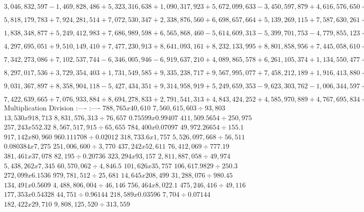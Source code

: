 \(3,046,832,597-1,469,828,486+5,323,316,638+1,090,317,923+5,672,099,633-3,450,597,879+4,616,576,650+2,490,531,866-6,087,202,362-2,060,006,143\)

\(5,818,179,783+7,924,281,514+7,072,530,347+2,338,876,560+6,698,657,664+5,139,269,115+7,587,630,261+8,889,254,029+1,070,797,560+2,544,433,806\)

\(1,838,348,877+5,249,412,983+7,686,989,598+6,565,868,460-5,614,609,313-5,399,701,753-4,779,855,123+4,718,397,326-7,372,173,189+5,226,089,928\)

\(4,297,695,051+9,510,149,410+7,477,230,913+8,641,093,161+8,232,133,995+8,801,858,956+7,445,058,610+5,932,935,282+5,090,830,532+5,159,256,924\)

\(7,342,273,086+7,102,537,744-6,346,005,946-6,919,637,210+4,089,865,578+6,261,105,374+1,134,550,477+1,790,088,083-9,911,246,085-1,025,755,541\)

\(8,297,017,536+3,729,354,403+1,731,549,585+9,335,238,717+9,567,995,077+7,458,212,189+1,916,413,880+8,261,869,572+9,872,992,690+1,007,645,965\)

\(9,031,367,897+8,358,904,118-5,427,434,351+9,314,958,919+5,249,659,353-9,623,303,762-1,006,344,597+3,211,691,813+2,908,950,955-7,443,428,246\)

\(7,422,639,665+7,076,933,884+8,694,278,833+2,791,541,313+4,843,424,252+4,585,970,889+4,767,695,834+7,745,519,868+6,614,663,568+5,753,224,187\)
\textbar{} Multiplication \textbar{} Division \textbar{} \textbar:----
\textbar:---- \textbar{} \textbar{} \(788,765 x 40,610\) \textbar{}
\(7,560,615,603÷93,803\) \textbar{} \textbar{} \(13,530 x 918,713\)
\textbar{} \(8,831,576,313÷76,657\) \textbar{} \textbar{}
\(0.75599 x 0.99407\) \textbar{} \(411,509.5654÷250,975\) \textbar{}
\textbar{} \(257,243 x 552.32\) \textbar{} \(8,567,517,915÷65,655\)
\textbar{} \textbar{} \(784,400 x 0.07097\) \textbar{}
\(49,972.26654÷155.1\) \textbar{} \textbar{} \(917,142 x 80,960\)
\textbar{} \(960.111708÷0.02012\) \textbar{} \textbar{}
\(318,733.6 x 1,757\) \textbar{} \(5,526,097,668÷56,511\) \textbar{}
\textbar{} \(0.080384 x 7,275\) \textbar{} \(251,006,600÷3,770\)
\textbar{} \textbar{} \(437,242 x 52,611\) \textbar{}
\(76,412,069÷777.19\) \textbar{} \textbar{} \(381,461 x 37,078\)
\textbar{} \(82,195÷0.20736\) \textbar{} \textbar{} \(323,294x 93,157\)
\textbar{} \(2,811,887,058÷49,974\) \textbar{} \textbar{}
\(5,438,262 x 7,345\) \textbar{} \(60,570,062÷4,846.5\) \textbar{}
\textbar{} \(101,626 x 35,757\) \textbar{} \(106,617.9829÷250.3\)
\textbar{} \textbar{} \(272,099 x 6.1536\) \textbar{}
\(979,781,512÷25,681\) \textbar{} \textbar{} \(14,645 x 208,499\)
\textbar{} \(31,288,076÷980.45\) \textbar{} \textbar{}
\(134,491 x 0.5609\) \textbar{} \(4,488,806,004÷46,146\) \textbar{}
\textbar{} \(756,464x 8,022.1\) \textbar{} \(475,246,416÷49,116\)
\textbar{} \textbar{} \(177,353 x 0.54328\) \textbar{}
\(44,751÷0.96144\) \textbar{} \textbar{} \(218,589x0.03596\) \textbar{}
\(7,704÷0.07144\) \textbar{} \textbar{} \(182,422 x 29,710\) \textbar{}
\(9,808,125,520÷313,559\) \textbar{}

